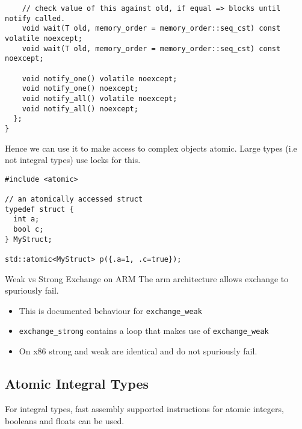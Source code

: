 \begin{verbatim}
    // check value of this against old, if equal => blocks until notify called.
    void wait(T old, memory_order = memory_order::seq_cst) const volatile noexcept;
    void wait(T old, memory_order = memory_order::seq_cst) const noexcept;

    void notify_one() volatile noexcept;
    void notify_one() noexcept;
    void notify_all() volatile noexcept;
    void notify_all() noexcept;
  };
}
\end{verbatim}
Hence we can use it to make access to complex objects atomic. Large types (i.e not integral types) use locks for this.
\begin{verbatim}
#include <atomic>

// an atomically accessed struct
typedef struct {
  int a;
  bool c;
} MyStruct;

std::atomic<MyStruct> p({.a=1, .c=true});
\end{verbatim}
\begin{sidenotebox}{Weak vs Strong Exchange on ARM}
  The arm architecture allows exchange to spuriously fail.
  \begin{itemize}
    \item This is documented behaviour for \texttt{exchange_weak}
    \item \texttt{exchange_strong} contains a loop that makes use of \texttt{exchange_weak}
    \item On x86 strong and weak are identical and do not spuriously fail. 
  \end{itemize}
\end{sidenotebox}
\subsection{Atomic Integral Types}
For integral types, fast assembly supported instructions for atomic integers, booleans and floats can be used.

